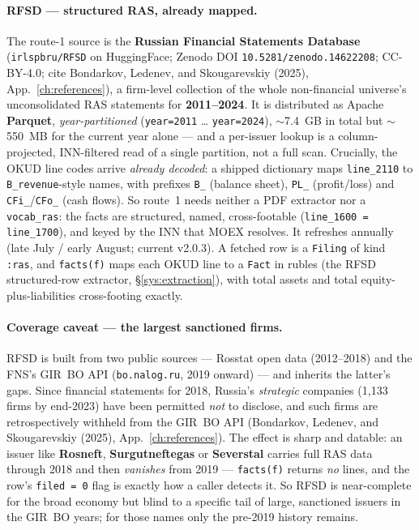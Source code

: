 \documentclass[11pt,a4paper]{report}
\begin{document}
\paragraph{RFSD --- structured RAS, already mapped.} The route-1 source is the \textbf{Russian Financial
Statements Database} (\texttt{irlspbru/RFSD} on HuggingFace; Zenodo DOI \texttt{10.5281/zenodo.14622208};
CC-BY-4.0; cite Bondarkov, Ledenev, and Skougarevskiy (2025), App.~\ref{ch:references}), a firm-level
collection of the whole non-financial universe's unconsolidated RAS statements for
\textbf{2011--2024}. It is distributed as Apache \textbf{Parquet}, \emph{year-partitioned} (\texttt{year=2011}
\ldots{} \texttt{year=2024}), $\sim$7.4~GB in total but $\sim$550~MB for the current year alone --- and a
per-issuer lookup is a column-projected, INN-filtered read of a single partition, not a full scan. Crucially,
the OKUD line codes arrive \emph{already decoded}: a shipped dictionary maps \texttt{line\_2110} to
\texttt{B\_revenue}-style names, with prefixes \texttt{B\_} (balance sheet), \texttt{PL\_} (profit/loss) and
\texttt{CFi\_}/\texttt{CFo\_} (cash flows). So route~1 needs neither a PDF extractor nor a \texttt{vocab\_ras}:
the facts are structured, named, cross-footable (\texttt{line\_1600 = line\_1700}), and keyed by the INN that
MOEX resolves. It refreshes annually (late July / early August; current v2.0.3). A fetched row is a
\texttt{Filing} of kind \texttt{:ras}, and \texttt{facts(f)} maps each OKUD line to a \texttt{Fact} in rubles
(the RFSD structured-row extractor, \S\ref{sys:extraction}), with total assets and total
equity-plus-liabilities cross-footing exactly.

\paragraph{Coverage caveat --- the largest sanctioned firms.} RFSD is built from two public sources ---
Rosstat open data (2012--2018) and the FNS's GIR~BO API (\texttt{bo.nalog.ru}, 2019 onward) --- and inherits
the latter's gaps. Since financial statements for 2018, Russia's \emph{strategic} companies (1{,}133 firms by
end-2023) have been permitted \emph{not} to disclose, and such firms are retrospectively withheld from the
GIR~BO API (Bondarkov, Ledenev, and Skougarevskiy (2025), App.~\ref{ch:references}). The effect is sharp and
datable: an issuer like \textbf{Rosneft}, \textbf{Surgutneftegas} or \textbf{Severstal} carries full RAS data
through 2018 and then \emph{vanishes} from 2019 --- \texttt{facts(f)} returns \emph{no} lines, and the row's
\texttt{filed = 0} flag is exactly how a caller detects it. So RFSD is near-complete for the broad economy
but blind to a specific tail of large, sanctioned issuers in the GIR~BO years; for those names only the
pre-2019 history remains.
\end{document}
